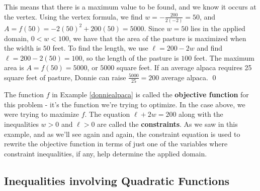 \documentclass{ximera}
\begin{document}
\begin{ex}
\medskip

This means that there is a maximum value to be found, and we know it occurs at the vertex.  Using the vertex formula, we find $w = -\frac{200}{2(-2)} = 50$, and $A = f(50) = -2(50)^2 + 200(50) = 5000$.  Since $w=50$ lies in the applied domain, $0 < w < 100$, we have that the area of the pasture is maximized when the width is $50$ feet.  To find the length, we use $\ell = 200-2w$ and find $ \ell = 200-2(50) = 100$, so the length of the pasture is $100$ feet.  The maximum area is $A =f(50) = 5000$, or $5000$ square feet.  If an average alpaca requires 25 square feet of pasture, Donnie can raise $\frac{5000}{25} = 200$ average alpaca. \qed

\end{ex}

The function $f$ in Example \ref{donniealpaca} is called the \textbf{objective function} for this problem - it's the function we're trying to optimize.  In the case above, we were trying to maximize $f$. The equation  $\ell+2w = 200$ along with the inequalities $w>0$ and $\ell >0$ are called the \textbf{constraints}.   As we saw in this example, and as we'll see again and again, the constraint equation is used to rewrite the objective function in terms of just one of the variables where constraint inequalities, if any, help determine the applied domain.

\subsection{Inequalities involving Quadratic Functions}
\label{QuadraticInequalities}
\end{document}
